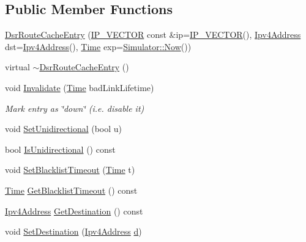 \subsection*{Public Member Functions}
\begin{DoxyCompactItemize}
\item 
\hyperlink{classns3_1_1dsr_1_1DsrRouteCacheEntry_a395788a4e8385604e2b358915f27a1c0}{Dsr\+Route\+Cache\+Entry} (\hyperlink{classns3_1_1dsr_1_1DsrRouteCacheEntry_ab834177006bdbfd2e3fa607c2a88cbdf}{I\+P\+\_\+\+V\+E\+C\+T\+OR} const \&ip=\hyperlink{classns3_1_1dsr_1_1DsrRouteCacheEntry_ab834177006bdbfd2e3fa607c2a88cbdf}{I\+P\+\_\+\+V\+E\+C\+T\+OR}(), \hyperlink{classns3_1_1Ipv4Address}{Ipv4\+Address} dst=\hyperlink{classns3_1_1Ipv4Address}{Ipv4\+Address}(), \hyperlink{classns3_1_1Time}{Time} exp=\hyperlink{classns3_1_1Simulator_ac3178fa975b419f7875e7105be122800}{Simulator\+::\+Now}())
\item 
virtual \hyperlink{classns3_1_1dsr_1_1DsrRouteCacheEntry_aa234003a16ab71770ee37377be87c04a}{$\sim$\+Dsr\+Route\+Cache\+Entry} ()
\item 
void \hyperlink{classns3_1_1dsr_1_1DsrRouteCacheEntry_aae6f1c986eeaac334515ecc7463b9cd9}{Invalidate} (\hyperlink{classns3_1_1Time}{Time} bad\+Link\+Lifetime)
\begin{DoxyCompactList}\small\item\em Mark entry as \char`\"{}down\char`\"{} (i.\+e. disable it) \end{DoxyCompactList}\item 
void \hyperlink{classns3_1_1dsr_1_1DsrRouteCacheEntry_ab787f789ceb2d127bdc619394fef328b}{Set\+Unidirectional} (bool u)
\item 
bool \hyperlink{classns3_1_1dsr_1_1DsrRouteCacheEntry_a339dd391005e2851bbd88d6894dcbae0}{Is\+Unidirectional} () const 
\item 
void \hyperlink{classns3_1_1dsr_1_1DsrRouteCacheEntry_a8adf202a6397e663ec1629fece934ebc}{Set\+Blacklist\+Timeout} (\hyperlink{classns3_1_1Time}{Time} t)
\item 
\hyperlink{classns3_1_1Time}{Time} \hyperlink{classns3_1_1dsr_1_1DsrRouteCacheEntry_aaa60fe593d50897f8242f14aabf0d2b1}{Get\+Blacklist\+Timeout} () const 
\item 
\hyperlink{classns3_1_1Ipv4Address}{Ipv4\+Address} \hyperlink{classns3_1_1dsr_1_1DsrRouteCacheEntry_a4a47cd8eb457d6dd2bf8dea6f3548322}{Get\+Destination} () const 
\item 
void \hyperlink{classns3_1_1dsr_1_1DsrRouteCacheEntry_a19593aef482ad1e8b2f08ce7402c9941}{Set\+Destination} (\hyperlink{classns3_1_1Ipv4Address}{Ipv4\+Address} \hyperlink{lte__pathloss_8m_a1aabac6d068eef6a7bad3fdf50a05cc8}{d})

\end{DoxyCompactItemize}

